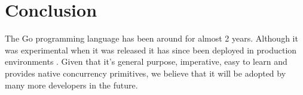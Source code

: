 \documentclass[8pt, twocolumn]{article}
\begin{document}
\section{Conclusion}
The Go programming language has been around for almost 2 years. Although
it was experimental when it was released it has since been deployed in
production environments \cite{heroku}. Given that it's general
purpose, imperative, easy to learn and provides native concurrency
primitives, we believe that it will be adopted by many more developers in the
future.
\nocite{*}
 

\end{document}
